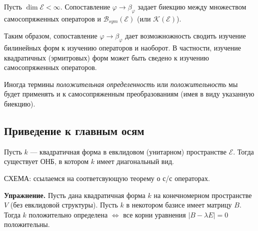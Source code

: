 \begin{sled2}\label{2111} 
Пусть $\dim \mathcal{E}<\infty$. 
Сопоставление $\varphi \to \beta_{\varphi}$ задает биекцию 
между множеством самосопряженных операторов и 
$\mathcal{B}_{sym} (\mathcal{E}) $ (или $\mathcal{K} (\mathcal{E})$). %
\end{sled2}



Таким образом, сопоставление 
 $\varphi \to \beta_{\varphi}$ дает возможножность 
сводить изучение билинейных форм к изучению операторов и наоборот.
В частности, изучение квадратичных (эрмитровых) форм может быть сведено
к изучению самосопряженных операторов.



Иногда термины {\it положительная определенность} или {\it положительность} 
мы будет применять и к самосопряженным преобразованиям (имея в виду указанную биекцию).




\subsection{Приведение к главным осям}



\begin{theor}\label{t10_7_1} 
Пусть $k$ --- квадратичная форма в евклидовом (унитарном) пространстве $\mathcal{E}$.
Тогда существует ОНБ, в котором $k$ имеет диагональный вид.
\end{theor}
\dok СХЕМА: ссылаемся на соответсвующую теорему о с/с операторах.
\edok

\otstup

{\bf Упражнение.}
Пусть дана квадратичная форма $k$ на конечномерном  пространстве $V$ (без евклидовой структуры).
 Пусть $k$ в некотором базисе имеет матрицу $B$. Тогда $k$ положительно определена 
$\Leftrightarrow$ все корни уравнения $|B-\lambda E|=0$ положительны. 

